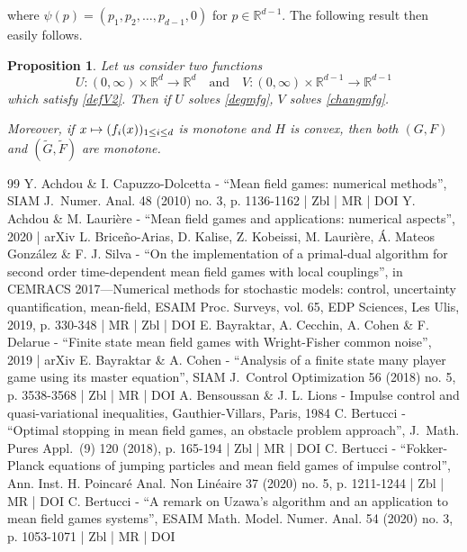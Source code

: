 \documentclass[10pt]{amsart}
\newcommand\mto{\mathchoice{\longmapsto}{\mapsto}{\mapsto}{\mapsto}}
\newtheorem{Prop}{Proposition}[section]
\theoremstyle{definition}
\begin{document}
where $\psi(p) = (p_1,p_2,\dots,p_{d-1},0)$ for $p \in \mathbb{R}^{d-1}$. The following result then easily follows.
\begin{Prop}
Let us consider two functions
\[
U: (0,\infty) \times \mathbb{R}^d \to \mathbb{R}^d\quad\text{and}\quad V: (0,\infty)\times \mathbb{R}^{d-1} \to \mathbb{R}^{d-1}
\]
which satisfy \eqref{defV2}. Then if $U$ solves \eqref{degmfg}, $V$ solves \eqref{changmfg}.

Moreover, if $x \mto (f_i(x))_{1\leq i \leq d}$ is monotone and $H$ is convex, then both $(G,F)$ and $(\tilde{G},\tilde{F})$ are monotone.
\end{Prop}



\begin{thebibliography}{99}
Y. Achdou \& I. Capuzzo-Dolcetta - “Mean field games: numerical methods”, SIAM J. Numer. Anal. 48 (2010) no. 3, p. 1136-1162 | Zbl | MR | DOI
Y. Achdou \& M. Laurière - “Mean field games and applications: numerical aspects”, 2020 | arXiv
L. Briceño-Arias, D. Kalise, Z. Kobeissi, M. Laurière, Á. Mateos González \& F. J. Silva - “On the implementation of a primal-dual algorithm for second order time-dependent mean field games with local couplings”, in CEMRACS 2017—Numerical methods for stochastic models: control, uncertainty quantification, mean-field, ESAIM Proc. Surveys, vol. 65, EDP Sciences, Les Ulis, 2019, p. 330-348 | MR | Zbl | DOI
E. Bayraktar, A. Cecchin, A. Cohen \& F. Delarue - “Finite state mean field games with Wright-Fisher common noise”, 2019 | arXiv
E. Bayraktar \& A. Cohen - “Analysis of a finite state many player game using its master equation”, SIAM J. Control Optimization 56 (2018) no. 5, p. 3538-3568 | Zbl | MR | DOI
A. Bensoussan \& J. L. Lions - Impulse control and quasi-variational inequalities, Gauthier-Villars, Paris, 1984
C. Bertucci - “Optimal stopping in mean field games, an obstacle problem approach”, J. Math. Pures Appl. (9) 120 (2018), p. 165-194 | Zbl | MR | DOI
C. Bertucci - “Fokker-Planck equations of jumping particles and mean field games of impulse control”, Ann. Inst. H. Poincaré Anal. Non Linéaire 37 (2020) no. 5, p. 1211-1244 | Zbl | MR | DOI
C. Bertucci - “A remark on Uzawa’s algorithm and an application to mean field games systems”, ESAIM Math. Model. Numer. Anal. 54 (2020) no. 3, p. 1053-1071 | Zbl | MR | DOI

\end{thebibliography}
\end{document}
